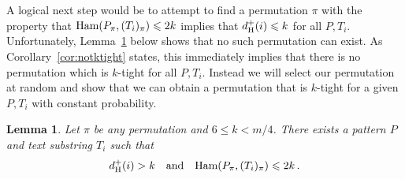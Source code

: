 \documentclass[11pt]{article}
\renewcommand{\leq}{\leqslant}
\newcommand{\ham}{\ensuremath{\textup{Ham}}}
\newcommand{\DsHam}{\ensuremath{d_\textup{H}^+}}
\newcommand{\dHam}{\DsHam}
\theoremstyle{plain}
\newtheorem{lemma}[theorem]{Lemma}
\theoremstyle{definition}
\begin{document}
A logical next step would be to attempt to find a permutation $\pi$ with the property that $\ham(P_\pi,(T_i)_{\pi}) \leq 2k$ implies that $\dHam(i) \leq k$ for all $P,T_i$. Unfortunately, Lemma~\ref{lem:notconv} below shows that no such permutation can exist. As Corollary~\ref{cor:notktight} states, this immediately implies that there is no permutation which is $k$-tight for all $P,T_i$. Instead we will select our permutation at random and show that we can obtain a permutation that is $k$-tight for a given $P,T_i$ with constant probability.


\begin{lemma}
    \label{lem:notconv}
    Let $\pi$ be any permutation and $6 \leq k < m/4$. There exists a pattern $P$ and text substring $T_i$ such that
\begin{equation*}
        \dHam(i) > k \quad \text{and} \quad \ham(P_\pi,(T_i)_{\pi}) \leq 2k \,.
    \end{equation*}
\end{lemma}
\end{document}
